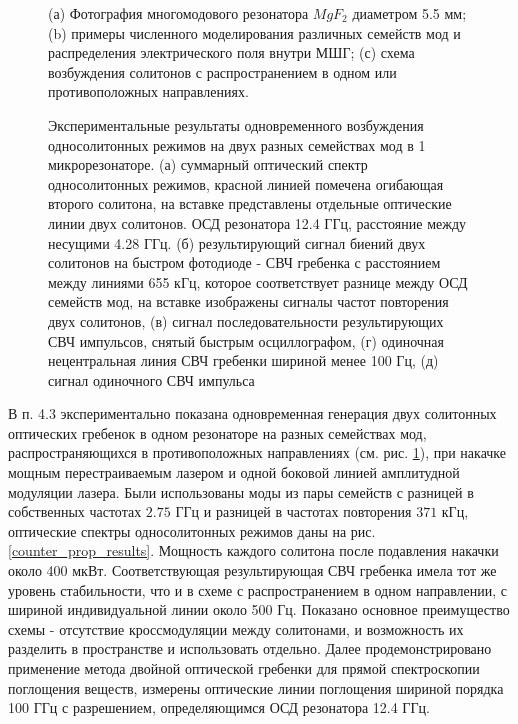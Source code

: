 \begin{figure}[ht]
\begin{minipage}[ht]{1\linewidth}
\end{minipage}
\caption{(а) Фотография многомодового резонатора $MgF_2$ диаметром 5.5 мм; (b) примеры численного моделирования различных семейств мод и распределения электрического поля внутри МШГ; (с) схема возбуждения солитонов с распространением в одном или противоположных направлениях.}
\label{Figure1_V1_c}
\end{figure}

\begin{figure}[ht]
\begin{minipage}[ht]{1\linewidth}
\end{minipage}
\caption{Экспериментальные результаты одновременного возбуждения односолитонных режимов на двух разных семействах мод в 1 микрорезонаторе. (а) суммарный оптический спектр односолитонных режимов, красной линией помечена огибающая второго солитона, на вставке представлены отдельные оптические линии двух солитонов. ОСД резонатора 12.4 ГГц, расстояние между несущими 4.28 ГГц. (б) результирующий сигнал биений двух солитонов на быстром фотодиоде - СВЧ гребенка с расстоянием между линиями 655 кГц, которое соответствует разнице между ОСД семейств мод, на вставке изображены сигналы частот повторения двух солитонов, (в) сигнал последовательности результирующих СВЧ импульсов, снятый быстрым осциллографом, (г) одиночная нецентральная линия СВЧ гребенки шириной менее 100 Гц, (д) сигнал одиночного СВЧ импульса}
\label{Co_Scheme_results}
\end{figure}

В п. 4.3 экспериментально показана одновременная генерация двух солитонных оптических гребенок в одном резонаторе на разных семействах мод, распространяющихся в противоположных направлениях (см. рис. \ref{Figure1_V1_c}), при накачке мощным перестраиваемым лазером и одной боковой линией амплитудной модуляции лазера. Были использованы моды из пары семейств с разницей в собственных частотах $2.75$ ГГц и разницей в частотах повторения $371$ кГц, оптические спектры односолитонных режимов даны на рис. \ref{counter_prop_results}. Мощность каждого солитона после подавления накачки около 400 мкВт. Соответствующая результирующая СВЧ гребенка имела тот же уровень стабильности, что и в схеме с распространением в одном направлении, с шириной индивидуальной линии около 500 Гц. Показано основное преимущество схемы - отсутствие кроссмодуляции между солитонами, и возможность их разделить в пространстве и использовать отдельно. Далее продемонстрировано применение метода двойной оптической гребенки для прямой спектроскопии поглощения веществ, измерены оптические линии поглощения шириной порядка 100 ГГц с разрешением, определяющимся ОСД резонатора 12.4 ГГц.


